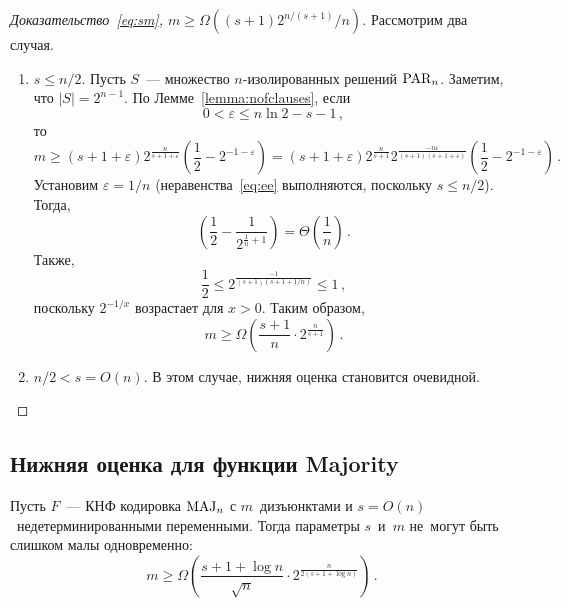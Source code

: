 \begin{proof}[Доказательство~\eqref{eq:sm}, $m \ge \Omega((s+1)2^{n/(s+1)}/n)$]
	Рассмотрим два случая.
	\begin{enumerate}
		\item $s \le n/2$.
		Пусть $S$~— множество $n$-изолированных решений $\operatorname{PAR}_n$. Заметим, что $|S| = 2^{n - 1}$. 
		По Лемме~\ref{lemma:nofclauses}, если 
		\begin{equation}\label{eq:ee}
			0 < \varepsilon \le n \ln 2 - s - 1\,,
		\end{equation}
		то
		\[ m \ge (s+1+\varepsilon) 2^{\frac{n}{s+1+\varepsilon}} \left(\frac{1}{2} - 2^{-1-\varepsilon}\right) = (s+1+\varepsilon) 2^{\frac{n}{s+1}} 2^{\frac{-n\varepsilon}{(s+1)(s+1+\varepsilon)}} \left(\frac{1}{2} - 2^{-1-\varepsilon}\right) \, .\]
		Установим $\varepsilon=1/n$ (неравенства~\eqref{eq:ee} выполняются, поскольку $s \le n/2$). Тогда,
		\[\left(\frac{1}{2} - \frac{1}{2^{\frac{1}{n} + 1}}\right) = \Theta\left(\frac{1}{n}\right)\,.\]
		Также,
		\[\frac{1}{2} \le 2^{\frac{-1}{(s+1)(s+1+1/n)}} \le 1\,,\]
		поскольку $2^{-1/x}$ возрастает для $x>0$.
		Таким образом,
		\[m \ge \Omega\left(\frac{s+1}{n} \cdot 2^{\frac{n}{s+1}}\right)\, .\]
		
		\item $n/2 < s =O(n)$. 
		В этом случае, нижняя оценка становится очевидной.
	\end{enumerate}
\end{proof}


\subsection{Нижняя оценка для функции Majority}

\begin{theorem}
	Пусть $F$~— КНФ кодировка $\operatorname{MAJ}_n$ с $m$~дизъюнктами и $s = O(n)$~недетерминированными переменными. Тогда параметры $s$~и~$m$ не~могут быть слишком малы одновременно:
	\begin{equation}
		m \ge \Omega\left(\frac{s+1 + \log n}{\sqrt{n}} \cdot 2^{\frac{n}{2(s+1 + \log n)}} \right) \, .
	\end{equation}
\end{theorem}

